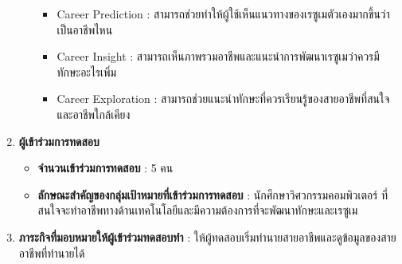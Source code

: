 \begin{enumerate}
\begin{itemize}
\begin{itemize}
                        \item Career Prediction : สามารถช่วยทำให้ผู้ใช้เห็นแนวทางของเรซูเมตัวเองมากขึ้นว่าเป็นอาชีพไหน
                        \item Career Insight : สามารถเห็นภาพรวมอาชีพและแนะนำการพัฒนาเรซูเมว่าควรมีทักษะอะไรเพิ่ม
                        \item Career Exploration : สามารถช่วยแนะนำทักษะที่ควรเรียนรู้ของสายอาชีพที่สนใจและอาชีพใกล้เคียง
                    \end{itemize}
          \end{itemize}
    \item \textbf{ผู้เข้าร่วมการทดสอบ}
          \begin{itemize}
              \item \textbf{จำนวนเข้าร่วมการทดสอบ} : 5 คน
              \item \textbf{ลักษณะสำคัญของกลุ่มเป้าหมายที่เข้าร่วมการทดสอบ} : นักศึกษาวิศวกรรมคอมพิวเตอร์ ที่สนใจจะทำอาชีพทางด้านเทคโนโลยีและมีความต้องการที่จะพัฒนาทักษะและเรซูเม
          \end{itemize}
    \item \textbf{ภาระกิจที่มอบหมายให้ผู้เข้าร่วมทดสอบทำ} : ให้ผู้ทดสอบเริ่มทำนายสายอาชีพและดูข้อมูลของสายอาชีพที่ทำนายได้
\end{enumerate}
